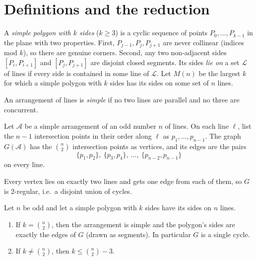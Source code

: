 \section{Definitions and the reduction}\label{sec:reduction}

\begin{definition}
A \emph{simple polygon with $k$ sides} ($k\ge3$) is a cyclic sequence of points $P_0,\dots,P_{k-1}$
in the plane with two properties. First, $P_{j-1},P_j,P_{j+1}$ are never collinear (indices mod $k$),
so there are genuine corners. Second, any two non-adjacent sides $[P_i,P_{i+1}]$ and $[P_j,P_{j+1}]$ are
disjoint closed segments. Its sides \emph{lie on} a set $\mathcal L$ of lines if every side is
contained in some line of $\mathcal L$. Let $M(n)$ be the largest $k$ for which a simple polygon with
$k$ sides has its sides on some set of $n$ lines.
\end{definition}

An arrangement of lines is \emph{simple} if no two lines are parallel and no three are concurrent.

\begin{definition}\label{def:G}
Let $\mathcal A$ be a simple arrangement of an odd number $n$ of lines. On each line $\ell$, list the
$n-1$ intersection points in their order along $\ell$ as $p_1,\dots,p_{n-1}$. The graph $G(\mathcal A)$
has the $\binom n2$ intersection points as vertices, and its edges are the pairs
\[
  \{p_1,p_2\},\ \{p_3,p_4\},\ \dots,\ \{p_{n-2},p_{n-1}\}
\]
on every line.
\end{definition}

Every vertex lies on exactly two lines and gets one edge from each of them, so $G$ is $2$-regular, i.e.\
a disjoint union of cycles.

\begin{proposition}\label{prop:forced}
Let $n$ be odd and let a simple polygon with $k$ sides have its sides on $n$ lines.
\begin{enumerate}
\item If $k=\binom n2$, then the arrangement is simple and the polygon's sides are exactly the edges
  of $G$ (drawn as segments). In particular $G$ is a single cycle.
\item If $k\ne\binom n2$, then $k\le\binom n2-3$.
\end{enumerate}
\end{proposition}

